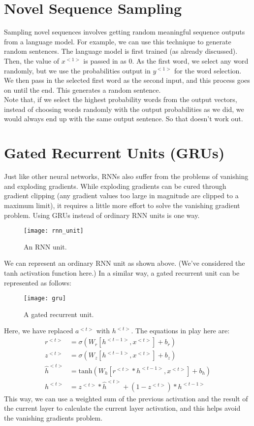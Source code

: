 \documentclass[a4paper, 12pt]{report}
\begin{document}
\section{Novel Sequence Sampling}
Sampling novel sequences involves getting random meaningful sequence outputs from a language model. For example, we can use this technique to generate random sentences. The language model is first trained (as already discussed). Then, the value of $x^{<1>}$ is passed in as 0. As the first word, we select any word randomly, but we use the probabilities output in $y^{<1>}$ for the word selection. We then pass in the selected first word as the second input, and this process goes on until the end. This generates a random sentence.\\
\break
Note that, if we select the highest probability words from the output vectors, instead of choosing words randomly with the output probabilities as we did, we would always end up with the same output sentence. So that doesn't work out.

\section{Gated Recurrent Units (GRUs)}
Just like other neural networks, RNNs also suffer from the problems of vanishing and exploding gradients. While exploding gradients can be cured through gradient clipping (any gradient values too large in magnitude are clipped to a maximum limit), it requires a little more effort to solve the vanishing gradient problem. Using GRUs instead of ordinary RNN units is one way.
\begin{figure}[H]
\centering
\texttt{[image: rnn\_unit]}
\caption{An RNN unit.}
\end{figure}
We can represent an ordinary RNN unit as shown above. (We've considered the tanh activation function here.) In a similar way, a gated recurrent unit can be represented as follows:
\begin{figure}[H]
\centering
\texttt{[image: gru]}
\caption{A gated recurrent unit.}
\end{figure}
Here, we have replaced $a^{<t>}$ with $h^{<t>}$. The equations in play here are:
\begin{align*}
r^{<t>} &= \sigma\left(W_r\left[h^{<t-1>}, x^{<t>}\right] + b_r\right)\\
z^{<t>} &= \sigma\left(W_z\left[h^{<t-1>}, x^{<t>}\right] + b_z\right)\\
\hat{h}^{<t>} &= \text{tanh}\left(W_h\left[r^{<t>}*h^{<t-1>}, x^{<t>}\right] + b_h\right)\\
h^{<t>} &= z^{<t>}*\hat{h}^{<t>} + \left(1-z^{<t>}\right)*h^{<t-1>}
\end{align*}
This way, we can use a weighted sum of the previous activation and the result of the current layer to calculate the current layer activation, and this helps avoid the vanishing gradients problem.
\end{document}
